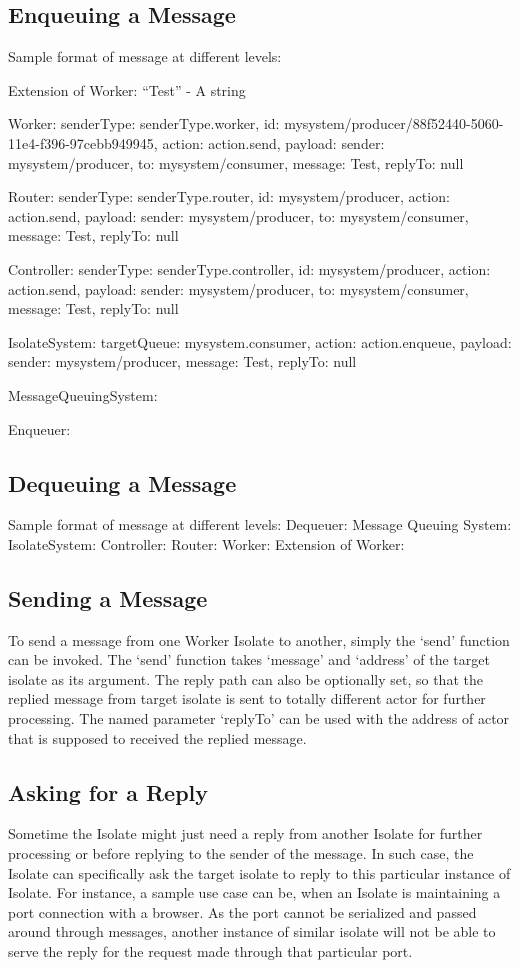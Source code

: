 \subsection{Enqueuing a Message}
Sample format of message at different levels:

Extension of Worker: “Test” - A string

Worker:
{senderType: senderType.worker, id: mysystem/producer/88f52440-5060-11e4-f396-97cebb949945, action: action.send, payload: {sender: mysystem/producer, to: mysystem/consumer, message: Test, replyTo: null}}

Router:
{senderType: senderType.router, id: mysystem/producer, action: action.send, payload: {sender: mysystem/producer, to: mysystem/consumer, message: Test, replyTo: null}}

Controller:
{senderType: senderType.controller, id: mysystem/producer, action: action.send, payload: {sender: mysystem/producer, to: mysystem/consumer, message: Test, replyTo: null}}

IsolateSystem:
{targetQueue: mysystem.consumer, action: action.enqueue, payload: {sender: mysystem/producer, message: Test, replyTo: null}}

MessageQueuingSystem:

Enqueuer:


\subsection{Dequeuing a Message}
Sample format of message at different levels:
Dequeuer:
Message Queuing System:
IsolateSystem:
Controller:
Router:
Worker:
Extension of Worker:

\subsection{Sending a Message}
To send a message from one Worker Isolate to another, simply the ‘send’ function can be invoked. The ‘send’ function takes ‘message’ and ‘address’ of the target isolate as its argument. The reply path can also be optionally set, so that the replied message from target isolate is sent to totally different actor for further processing. The named parameter ‘replyTo’ can be used with the address of actor that is supposed to received the replied message.

\subsection{Asking for a Reply}
Sometime the Isolate might just need a reply from another Isolate for further processing or before replying to the sender of the message. In such case, the Isolate can specifically ask the target isolate to reply to this particular instance of Isolate.
For instance, a sample use case can be, when an Isolate is maintaining a port connection with a browser. As the port cannot be serialized and passed around through messages, another instance of similar isolate will not be able to serve the reply for the request made through that particular port.

